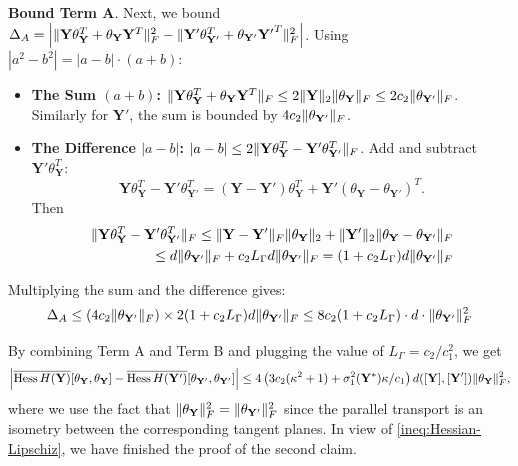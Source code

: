\documentclass[11pt]{article}
\newcommand{\0}{{\mathbf{0}}}
\newcommand{\1}{{\mathbf{1}}}
\newcommand{\Y}{{\mathbf{Y}}}
\newcommand{\F}{{\rm F}}
\begin{document}
{{ \noindent \bf  Bound Term A}.
Next, we bound $\Delta_A = \Big| \| \mathbf{Y}\theta_{\mathbf{Y}}^T + \theta_{\mathbf{Y}} \mathbf{Y}^T \|_{\F}^2 - \| \mathbf{Y'}\theta_{\mathbf{Y'}}^T + \theta_{\mathbf{Y'}} \mathbf{Y'}^T \|_{\F}^2 \Big|$.
Using $|a^2 - b^2| = |a - b| \cdot (a + b)$:
\begin{itemize}
    \item \textbf{The Sum $(a+b)$:}
    $\| \mathbf{Y}\theta_{\mathbf{Y}}^T + \theta_{\mathbf{Y}} \mathbf{Y}^T \|_{\F} \le 2\|\mathbf{Y}\|_2\|\theta_{\mathbf{Y}}\|_{\F} \le 2 c_2 \|\theta_{\mathbf{Y'}}\|_{\F}$. 
    Similarly for $\mathbf{Y'}$, the sum is bounded by $4 c_2 \|\theta_{\mathbf{Y'}}\|_{\F}$.
    \item \textbf{The Difference $|a-b|$:}
    $|a-b| \le 2 \| \mathbf{Y}\theta_{\mathbf{Y}}^T - \mathbf{Y'}\theta_{\mathbf{Y'}}^T \|_{\F}$.
    Add and subtract $\mathbf{Y'}\theta_{\mathbf{Y}}^T$:
    \[
    \mathbf{Y}\theta_{\mathbf{Y}}^T - \mathbf{Y'}\theta_{\mathbf{Y'}}^T = (\mathbf{Y}-\mathbf{Y'})\theta_{\mathbf{Y}}^T + \mathbf{Y'}(\theta_{\mathbf{Y}} - \theta_{\mathbf{Y'}})^T.
    \] 
Then
    \[
    \begin{split}
    	\| \mathbf{Y}\theta_{\mathbf{Y}}^T - \mathbf{Y'}\theta_{\mathbf{Y'}}^T \|_{\F} \le \|\mathbf{Y}-\mathbf{Y'}\|_{\F} \|\theta_{\mathbf{Y}}\|_2 + \|\mathbf{Y'}\|_2 \|\theta_{\mathbf{Y}} - \theta_{\mathbf{Y'}}\|_{\F}\\
    	\le d \|\theta_{\mathbf{Y'}}\|_{\F} + c_2 L_{\Gamma} d \|\theta_{\mathbf{Y'}}\|_{\F} = (1 + c_2 L_{\Gamma}) d \|\theta_{\mathbf{Y'}}\|_{\F}
    \end{split}
    \]
\end{itemize}
Multiplying the sum and the difference gives:
\[
\Delta_A \le (4 c_2 \|\theta_{\mathbf{Y'}}\|_{\F}) \times 2(1 + c_2 L_{\Gamma}) d \|\theta_{\mathbf{Y'}}\|_{\F}
 \le 8 c_2 (1 + c_2 L_{\Gamma}) \cdot d \cdot \|\theta_{\mathbf{Y'}}\|_{\F}^2 \]

By combining Term A and Term B and plugging the value of $L_{\Gamma} = c_2/c_1^2$, we get 
\[
 \Big|\overline{\text{Hess}\, H(\mathbf{Y})}[\theta_{\mathbf{Y}}, \theta_{\mathbf{Y}}] - \overline{\text{Hess}\, H(\mathbf{Y'})}[\theta_{\mathbf{Y'}}, \theta_{\mathbf{Y'}}] \Big| \le 4 \left( 3 c_2 (\kappa^2 +1) + \sigma^2_1(\Y^*) \kappa/c_1  \right) d([\Y], [\Y'] ) \| \theta_{\mathbf{Y}} \|^2_{\F},
\] where we use the fact that $\| \theta_{\mathbf{Y}} \|^2_{\F} = \| \theta_{\mathbf{Y}'} \|^2_{\F}$ since the parallel transport is an isometry between the corresponding tangent planes. In view of \eqref{ineq:Hessian-Lipschiz}, we have finished the proof of the second claim.


}
\end{document}

